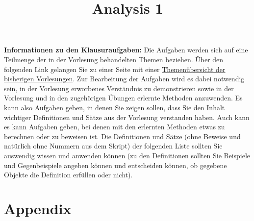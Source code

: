 \documentclass[10pt,a4paper,twoside]{article}
\title{Analysis 1}
\author{}
\begin{document}
\pagestyle{fancy}
\setcounter{page}{1}

\maketitle

\textbf{Informationen zu den Klausuraufgaben:} Die Aufgaben werden sich auf eine Teilmenge der in der Vorlesung behandelten Themen beziehen. Über den folgenden Link gelangen Sie zu einer Seite mit einer 
\href{http://www.math.lmu.de/~philip/teaching/2017_calc1_forInfAndStatStudents/summary.html}{Themenübersicht der bisherigen Vorlesungen}. 
Zur Bearbeitung der Aufgaben wird es dabei notwendig sein, in der Vorlesung erworbenes Verständnis zu demonstrieren sowie in der Vorlesung und in den zugehörigen Übungen erlernte Methoden anzuwenden. Es kann also Aufgaben geben, in denen Sie zeigen sollen, dass Sie den Inhalt wichtiger Definitionen und Sätze aus der Vorlesung verstanden haben. Auch kann es kann Aufgaben geben, bei denen mit den erlernten Methoden etwas zu berechnen oder zu beweisen ist. Die Definitionen und Sätze (ohne Beweise und natürlich ohne Nummern aus dem Skript) der folgenden Liste sollten Sie auswendig wissen und anwenden können (zu den Definitionen sollten Sie Beispiele und Gegenbeispiele angeben können und entscheiden können, ob gegebene Objekte die Definition erfüllen oder nicht). 

\tableofcontents
\cleardoublepage

\setcounter{page}{1}
\fancyhead[LO,RE]{\leftmark}
\fancyfoot[LE,RO]{\thepage}













\section{Appendix}

\end{document}
